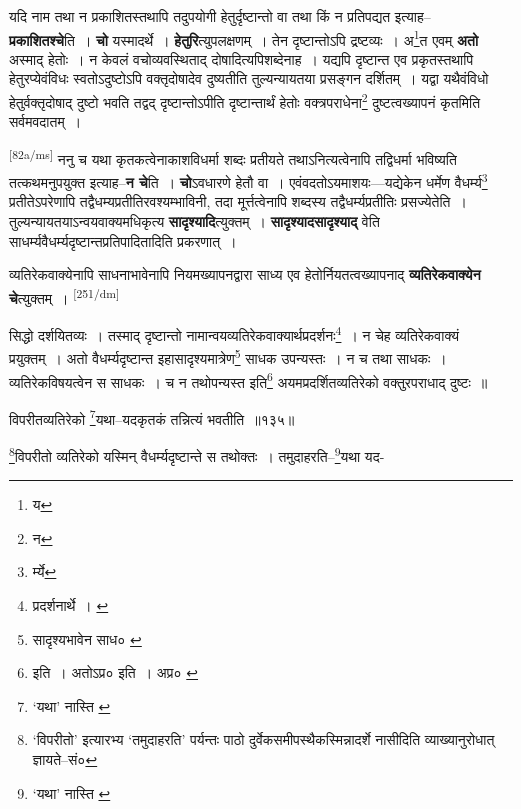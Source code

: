 \documentclass[article,12pt,a4paper]{memoir}
\begin{document}
	  \pstart यदि नाम तथा न प्रकाशितस्तथापि तदुपयोगी हेतुर्दृष्टान्तो वा तथा किं न प्रतिपद्यत इत्याह--\textbf{प्रकाशितश्चे}ति । \textbf{चो} यस्मादर्थे । \textbf{हेतुरि}त्युपलक्षणम् । तेन दृष्टान्तोऽपि द्रष्टव्यः । अ\footnote{य}त एवम् \textbf{अतो} अस्माद् हेतोः । न केवलं वचोव्यवस्थिताद् दोषादित्यपिशब्देनाह । यद्यपि दृष्टान्त एव प्रकृतस्तथापि हेतुरप्येवंविधः स्वतोऽदुष्टोऽपि वक्तृदोषादेव दुष्यतीति तुल्यन्यायतया प्रसङ्गन दर्शितम् । यद्वा यथैवंविधो हेतुर्वक्तृदोषाद् दुष्टो भवति तद्वद् दृष्टान्तोऽपीति दृष्टान्तार्थं हेतोः वक्त्रपराधेना\footnote{न} दुष्टत्वख्यापनं कृतमिति सर्वमवदातम् ।
	\pend
      

	  \pstart \leavevmode\textsuperscript{\rmlatinfont\tiny [82a/ms]} ननु च यथा कृतकत्वेनाकाशविधर्मा शब्दः प्रतीयते तथाऽनित्यत्वेनापि तद्विधर्मा भविष्यति तत्कथमनुपयुक्त इत्याह--\textbf{न चे}ति । \textbf{चो}ऽवधारणे हेतौ वा । एवंवदतोऽयमाशयः—यद्येकेन धर्मेण वैधर्म्य\footnote{र्म्ये} प्रतीतेऽपरेणापि तद्वैधम्यप्रतीतिरवश्यम्भाविनी, तदा मूर्त्तत्वेनापि शब्दस्य तद्वैधर्म्यप्रतीतिः प्रसज्येतेति । तुल्यन्यायतयाऽन्वयवाक्यमधिकृत्य \textbf{सादृश्यादि}त्युक्तम् । \textbf{सादृश्यादसादृश्याद्} वेति साधर्म्यवैधर्म्यदृष्टान्तप्रतिपादितादिति प्रकरणात् ।
	\pend
      

	  \pstart व्यतिरेकवाक्येनापि साधनाभावेनापि नियमख्यापनद्वारा साध्य एव हेतोर्नियतत्वख्यापनाद् \textbf{व्यतिरेकवाक्येन चे}त्युक्तम् ।
	\pend
      \leavevmode\textsuperscript{\rmlatinfont\tiny [251/dm]}

	  \pstart सिद्धो दर्शयितव्यः । तस्माद् दृष्टान्तो नामान्वयव्यतिरेकवाक्यार्थप्रदर्शनः\footnote{प्रदर्शनार्थे । \cite{dp-msC} \cite{dp-msD}} । न चेह व्यतिरेकवाक्यं प्रयुक्तम् । अतो वैधर्म्यदृष्टान्त इहासादृश्यमात्रेण\footnote{सादृश्यभावेन साध० \cite{dp-msA} \cite{dp-msB} \cite{dp-edP} \cite{dp-edH} \cite{dp-edN}} साधक उपन्यस्तः । न च तथा साधकः । व्यतिरेकविषयत्वेन स साधकः । च न तथोपन्यस्त इति\footnote{इति । अतोऽप्र० \cite{dp-msA} \cite{dp-edP} \cite{dp-edH} \cite{dp-edE} \cite{dp-edN} इति । अप्र० \cite{dp-msC}} अयमप्रदर्शितव्यतिरेको वक्तुरपराधाद् दुष्टः ॥
	\pend
       

	  \pstart विपरीतव्यतिरेको \footnote{‘यथा’ नास्ति \cite{dp-msD}}यथा--यदकृतकं तन्नित्यं भवतीति ॥१३५॥
	\pend
       

	  \pstart \footnote{‘विपरीतो’ इत्यारभ्य ‘तमुदाहरति’ पर्यन्तः पाठो दुर्वेकसमीपस्थैकस्मिन्नादर्शे नासीदिति व्याख्यानुरोधात् ज्ञायते--सं०}विपरीतो व्यतिरेको यस्मिन् वैधर्म्यदृष्टान्ते स तथोक्तः । तमुदाहरति--\footnote{‘यथा’ नास्ति \cite{dp-msA} \cite{dp-msB} \cite{dp-edP} \cite{dp-edH} \cite{dp-edE} \cite{dp-edN}}यथा यद-
	\pend
      
\end{document}
